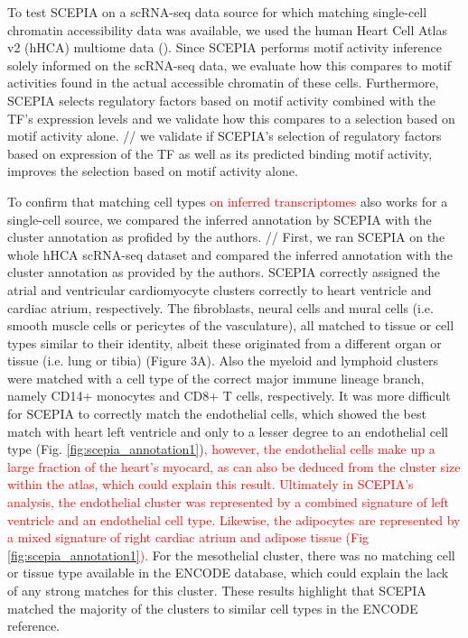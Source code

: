 To test SCEPIA on a scRNA-seq data source for which matching single-cell chromatin accessibility data was available, we used the human Heart Cell Atlas v2 (hHCA) multiome data (\cite{Kanemaru2023}). Since SCEPIA performs motif activity inference solely informed on the scRNA-seq data, we evaluate how this compares to motif activities found in the actual accessible chromatin of these cells. Furthermore, SCEPIA selects regulatory factors based on motif activity combined with the TF's expression levels and we validate how this compares to a selection based on motif activity alone. // we validate if SCEPIA's selection of regulatory factors based on expression of the TF as well as its predicted binding motif activity, improves the selection based on motif activity alone.

To confirm that matching cell types \textcolor{red}{on inferred transcriptomes} also works for a single-cell source, we compared the inferred annotation by SCEPIA with the cluster annotation as profided by the authors. // First, we ran SCEPIA on the whole hHCA scRNA-seq dataset and compared the inferred annotation with the cluster annotation as provided by the authors. SCEPIA correctly assigned the atrial and ventricular cardiomyocyte clusters correctly to heart ventricle and cardiac atrium, respectively. The fibroblasts, neural cells and mural cells (i.e. smooth muscle cells or pericytes of the vasculature), all matched to tissue or cell types similar to their identity, albeit these originated from a different organ or tissue (i.e. lung or tibia) (Figure 3A). Also the myeloid and lymphoid clusters were matched with a cell type of the correct major immune lineage branch, namely CD14+ monocytes and CD8+ T cells, respectively. It was more difficult for SCEPIA to correctly match the endothelial cells, which showed the best match with heart left ventricle and only to a lesser degree to an endothelial cell type (Fig. \ref{fig:scepia_annotation1})\textcolor{red}{, however, the endothelial cells make up a large fraction of the heart's myocard, as can also be deduced from the cluster size within the atlas, which could explain this result. Ultimately in SCEPIA's analysis, the endothelial cluster was represented by a combined signature of left ventricle and an endothelial cell type. Likewise, the adipocytes are represented by a mixed signature of right cardiac atrium and adipose tissue (Fig \ref{fig:scepia_annotation1}).} For the mesothelial cluster, there was no matching cell or tissue type available in the ENCODE database, which could explain the lack of any strong matches for this cluster. These results highlight that SCEPIA matched the majority of the clusters to similar cell types in the ENCODE reference. 

